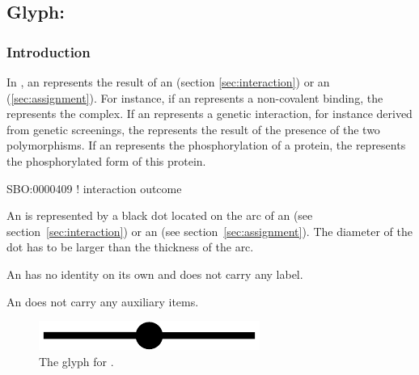 
\color{green}
\subsection{Glyph: }\label{sec:outcome}

\subsubsection{Introduction}

In \ER, an  represents the result of an  (section \ref{sec:interaction}) or an  (\ref{sec:assignment}). For instance, if an  represents a non-covalent binding, the  represents the complex. If an  represents a genetic interaction, for instance derived from genetic screenings, the  represents the result of the presence of the two polymorphisms. If an  represents the phosphorylation of a protein, the  represents the phosphorylated form of this protein.

\begin{glyphDescription}

\glyphSboTerm SBO:0000409 ! interaction outcome

\glyphContainer  An  is represented by a black dot located on the arc of an  (see section~\ref{sec:interaction}) or an  (see section~\ref{sec:assignment}). The diameter of the dot has to be larger than the thickness of the arc.

\glyphLabel An  has no identity on its own and does not carry any label. 

\glyphAux An  does not carry any auxiliary items.

\end{glyphDescription}

\begin{figure}[H]
  \centering
  \includegraphics[scale = 0.3]{images/outcome}
  \caption{The \ER glyph for .}
  \label{fig:outcome}
\end{figure}

\normalcolor
	
